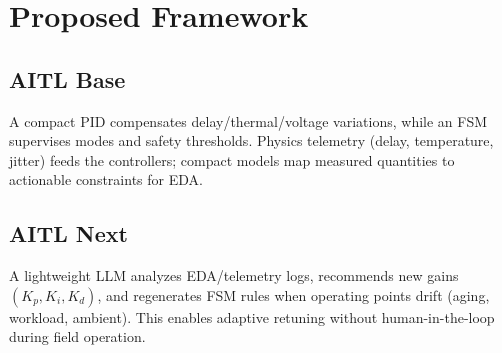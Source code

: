 \documentclass[conference]{IEEEtran}
\begin{document}
\section{Proposed Framework}
\subsection{AITL Base}
A compact PID compensates delay/thermal/voltage variations, while an FSM supervises modes and safety thresholds. Physics telemetry (delay, temperature, jitter) feeds the controllers; compact models map measured quantities to actionable constraints for EDA.

\subsection{AITL Next}
A lightweight LLM analyzes EDA/telemetry logs, recommends new gains $(K_p, K_i, K_d)$, and regenerates FSM rules when operating points drift (aging, workload, ambient). This enables adaptive retuning without human-in-the-loop during field operation.
\end{document}
